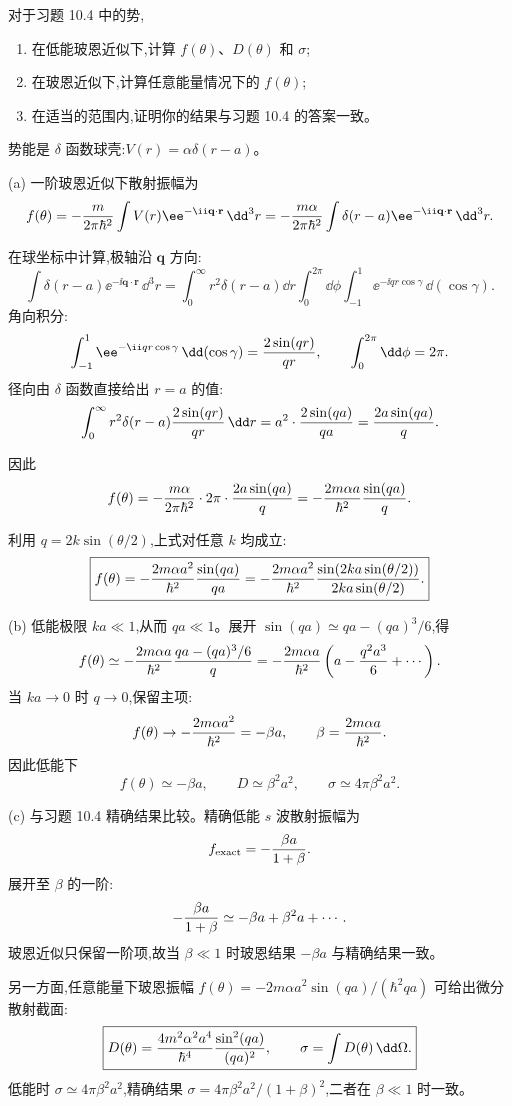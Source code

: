 \begin{question}
对于习题 10.4 中的势,
\begin{enumerate}
\item 在低能玻恩近似下,计算 $f(\theta)$、$D(\theta)$ 和 $\sigma$;
\item 在玻恩近似下,计算任意能量情况下的 $f(\theta)$;
\item 在适当的范围内,证明你的结果与习题 10.4 的答案一致。
\end{enumerate}
\begin{solution}
势能是 $\delta$ 函数球壳:$V(r)=\alpha\delta(r-a)$。

(a) 一阶玻恩近似下散射振幅为
\[
f(\theta)=-{m\over2\pi\hbar^2}\int V(r)\ee^{-\ii\mathbf q\cdot\mathbf r}\,\dd^3r
=-{m\alpha\over2\pi\hbar^2}\int \delta(r-a)\ee^{-\ii\mathbf q\cdot\mathbf r}\,\dd^3r.
\]

在球坐标中计算,极轴沿 $\mathbf q$ 方向:
\[
\int \delta(r-a)\ee^{-\ii\mathbf q\cdot\mathbf r}\,\dd^3r
=\int_0^\infty r^2\delta(r-a)\dd r\int_0^{2\pi}\dd\phi\int_{-1}^{1}\ee^{-\ii qr\cos\gamma}\,\dd(\cos\gamma).
\]
角向积分:
\[
\int_{-1}^{1}\ee^{-\ii qr\cos\gamma}\,\dd(\cos\gamma)={2\sin(qr)\over qr},
\qquad\int_0^{2\pi}\dd\phi=2\pi.
\]
径向由 $\delta$ 函数直接给出 $r=a$ 的值:
\[
\int_0^\infty r^2\delta(r-a){2\sin(qr)\over qr}\,\dd r
=a^2\cdot{2\sin(qa)\over qa}={2a\sin(qa)\over q}.
\]

因此
\[
f(\theta)=-{m\alpha\over2\pi\hbar^2}\cdot2\pi\cdot{2a\sin(qa)\over q}
=-{2m\alpha a\over\hbar^2}{\sin(qa)\over q}.
\]

利用 $q=2k\sin(\theta/2)$,上式对任意 $k$ 均成立:
\[
\boxed{f(\theta)=-{2m\alpha a^2\over\hbar^2}{\sin(qa)\over qa}
=-{2m\alpha a^2\over\hbar^2}{\sin(2ka\sin(\theta/2))\over 2ka\sin(\theta/2)}.}
\]

(b) 低能极限 $ka\ll1$,从而 $qa\ll1$。展开 $\sin(qa)\simeq qa-(qa)^3/6$,得
\[
f(\theta)\simeq-{2m\alpha a\over\hbar^2}{qa-(qa)^3/6\over q}
=-{2m\alpha a\over\hbar^2}\left(a-{q^2a^3\over6}+\cdots\right).
\]
当 $ka\to0$ 时 $q\to0$,保留主项:
\[
f(\theta)\to-{2m\alpha a^2\over\hbar^2}=-\beta a,
\qquad\beta={2m\alpha a\over\hbar^2}.
\]
因此低能下
\[
\boxed{f(\theta)\simeq -\beta a,\qquad
D\simeq \beta^2a^2,\qquad
\sigma\simeq 4\pi\beta^2a^2.}
\]

(c) 与习题 10.4 精确结果比较。精确低能 $s$ 波散射振幅为
\[
f_{\text{exact}}=-{\beta a\over1+\beta}.
\]
展开至 $\beta$ 的一阶:
\[
-{\beta a\over1+\beta}\simeq-\beta a+\beta^2a+\cdots.
\]
玻恩近似只保留一阶项,故当 $\beta\ll1$ 时玻恩结果 $-\beta a$ 与精确结果一致。

另一方面,任意能量下玻恩振幅 $f(\theta)=-2m\alpha a^2\sin(qa)/(\hbar^2qa)$ 可给出微分散射截面:
\[
\boxed{D(\theta)={4m^2\alpha^2a^4\over\hbar^4}{\sin^2(qa)\over(qa)^2},
\qquad
\sigma=\int D(\theta)\,\dd\Omega.}
\]
低能时 $\sigma\simeq 4\pi\beta^2a^2$,精确结果 $\sigma=4\pi\beta^2a^2/(1+\beta)^2$,二者在 $\beta\ll1$ 时一致。
\end{solution}
\end{question}

